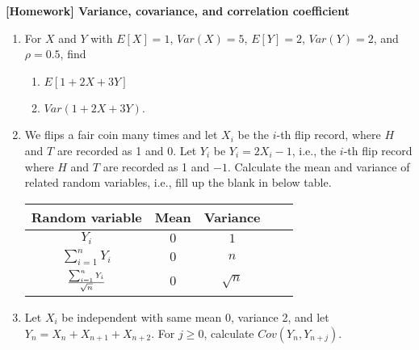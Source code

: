 \documentclass[12pt]{article}%
\newcommand{\0}{{\bf 0}}
\newcommand{\ra}[1]{\renewcommand{\arraystretch}{#1}}
\begin{document}
\newcommand{\ngi}{n \ra \infty}

\pagestyle{myheadings} 

\thispagestyle{plain}


\begin{center}
{\Large\bf [Homework] Variance, covariance, and correlation coefficient} 
\end{center}






\begin{enumerate}




\item
For $X$ and $Y$ with $E[X] = 1$, $Var(X) = 5$, $E[Y] = 2$, $Var(Y) = 2$, and $\rho=0.5$,  find 
\begin{enumerate}
\item $E[1 + 2X+3Y]$

\item $Var(1 + 2X+3Y)$.
\\
{\color{blue}{\bf Sol.}}


\end{enumerate}





 \item
We flips a fair coin many times
and let $X_i$ be the $i$-th flip record,
where $H$ and $T$ are recorded as 1 and 0.
Let $Y_i$ be $Y_i=2X_i-1$, i.e.,
the $i$-th flip record
where $H$ and $T$ are recorded as 1 and $-1$.
Calculate the mean and variance of related random variables,
i.e., fill up the blank in below table.
\begin{table}[H]    \center
\begin{tabular}{|c||c|c|c||c|} \hline
Random variable&Mean&Variance\\\hline\hline  
$Y_i$&$0$&$1$\\\hline
$\sum_{i=1}^nY_i$&$0$&$n$\\\hline
$\frac{\sum_{i=1}^nY_i}{\sqrt{n}}$&$0$&$\sqrt{n}$\\\hline
\end{tabular}
\end{table}




\item
Let $X_i$ be independent with same mean 0, variance 2, and
let $Y_n=X_n+X_{n+1}+X_{n+2}$.
For $j\ge 0$, calculate $Cov(Y_n,Y_{n+j})$.



\end{enumerate}
\end{document}
